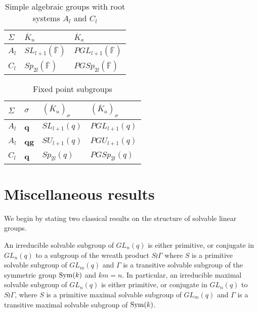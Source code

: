 \begin{table}[] 
\centering
\caption{Simple algebraic groups with root systems $A_l$ and $C_l$}
\begin{tabular}{|l|l|l|} 
\hline
$\Sigma$ & $\overline{K}_u$  \phantom{ \LARGE G}     & $\overline{K}_a$        \\ \hline
$A_l$    & $SL_{l+1}(\overline{\mathbb{F}})$ & $PGL_{l+1}(\overline{\mathbb{F}})$ \\ \hline
$C_l$    & $Sp_{2l}(\overline{\mathbb{F}})$  & $PGSp_{2l}(\overline{\mathbb{F}})$ \\ \hline
\end{tabular}
\label{algAC}
\end{table}
\begin{table}[] 
\centering
\caption{Fixed point subgroups}
\begin{tabular}{|l|l|l|l|}  
\hline
$\Sigma$ & $\sigma$ & $(\overline{K}_u)_{\sigma}$ \phantom{ \LARGE G} & $(\overline{K}_a)_{\sigma}$ \\ \hline
$A_l$    & {\bf q}  & $SL_{l+1}(q)$    & $PGL_{l+1}(q)$   \\ \hline
$A_l$    & {\bf qg} & $SU_{l+1}(q)$    & $PGU_{l+1}(q)$   \\ \hline
$C_l$    & {\bf q}  & $Sp_{2l}(q)$     & $PGSp_{2l}(q)$   \\ \hline
\end{tabular}
\label{algSIG}
\end{table}


  



\section{Miscellaneous results}
\label{missec}

 We begin by stating two classical results on the structure of solvable linear groups.
\begin{Lem} \label{supirr}
An irreducible solvable subgroup of $GL_n(q)$ is either primitive, or conjugate in $GL_n(q)$ to a subgroup of the wreath product
$S \wr \Gamma$
where $S$ is a primitive solvable subgroup of $GL_m(q)$ and $\Gamma$ is a transitive solvable
subgroup of the symmetric group $\mathrm{Sym}(k)$ and $km = n$. In particular, an irreducible maximal solvable  subgroup of 
$GL_n(q)$ is either primitive, or conjugate in $GL_n(q)$
to  $S \wr \Gamma$, where $S$ is a  primitive maximal solvable subgroup of $GL_m(q)$
and $\Gamma$ is a  transitive maximal solvable subgroup of $\mathrm{Sym}(k)$.
\end{Lem}

